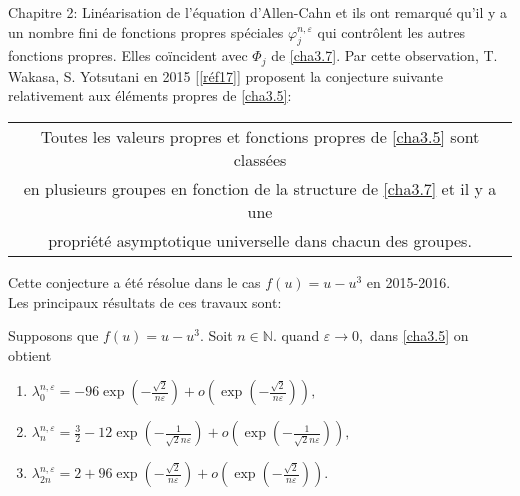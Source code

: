 \documentclass[mathserif,10pt]{beamer}
\begin{document}
\begin{frame}{Chapitre 2: Linéarisation de l'équation d'Allen-Cahn  }\transglitter[duration=1]
et ils ont remarqué qu'il y a un nombre fini de fonctions propres spéciales $\varphi_{j}^{n,\varepsilon}$  qui 
contrôlent les autres fonctions propres. Elles coïncident avec $\Phi_{j}$  de \eqref{cha3.7}. Par cette observation, T. Wakasa, S. Yotsutani en 2015 [\ref{réf17}] proposent la conjecture suivante  relativement aux éléments propres de \eqref{cha3.5}:\\ \pause
\begin{center}
\begin{tabular}{|c|}
\hline 
 Toutes les valeurs propres et fonctions propres de \eqref{cha3.5} sont classées \\
 en plusieurs groupes en fonction
 de la structure de \eqref{cha3.7} et il  y a une \\
 propriété asymptotique universelle dans chacun des groupes.\hspace*{1.25cm}
\\ 
\hline 
\end{tabular} 
\end{center}
Cette conjecture a été résolue dans le cas $f(u)=u-u^{3}$ en 2015-2016.\\
Les principaux résultats de ces travaux sont: \pause
\begin{theorem}\label{theorem1}
 Supposons que $f(u)= u- u^{3}$. Soit $n \in \mathbb{N}$. quand $\varepsilon \longrightarrow 0,$ dans \eqref{cha3.5} on obtient
 \begin{enumerate}
 \item $ \lambda_{0}^{n,\varepsilon } = -96 \exp (-\frac{\sqrt{2}}{n\varepsilon}) + o(\exp (-\frac{\sqrt{2}}{n\varepsilon})), $
  \item $\lambda_{n}^{n,\varepsilon } = \frac{3}{2} -12 \exp (-\frac{1}{\sqrt{2}n\varepsilon}) + o(\exp (-\frac{1}{\sqrt{2}n\varepsilon})),$
  \item $ \lambda_{2n}^{n,\varepsilon } = 2 + 96 \exp (-\frac{\sqrt{2}}{n\varepsilon}) + o(\exp (-\frac{\sqrt{2}}{n\varepsilon})).$
 \end{enumerate}
 \end{theorem}
 \end{frame} 
\end{document}

